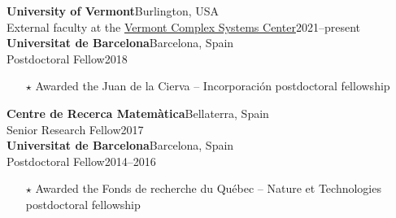 \documentclass[11pt]{article}
\begin{document}
%
\textbf{University of Vermont}\hfill Burlington, USA\\
External faculty at the \href{https://vermontcomplexsystems.org}{Vermont Complex Systems Center}\hfill 2021--present\vspace{0.75\baselineskip}\\
%
\textbf{Universitat de Barcelona}\hfill Barcelona, Spain\\
Postdoctoral Fellow\hfill 2018
\begin{itemize}[noitemsep, leftmargin=1.5em, topsep=0pt, after=\vspace{0.75\baselineskip}]\small
  \item[$\star$] Awarded the Juan de la Cierva -- Incorporaci\'on postdoctoral fellowship
\end{itemize}
%
\textbf{Centre de Recerca Matem\`atica}\hfill Bellaterra, Spain\\
Senior Research Fellow\hfill 2017\vspace{0.75\baselineskip}\\
%
\textbf{Universitat de Barcelona}\hfill Barcelona, Spain\\
Postdoctoral Fellow\hfill 2014--2016
\begin{itemize}[noitemsep, leftmargin=1.5em, topsep=0pt, after=\vspace{0.75\baselineskip}]\small
  \item[$\star$] Awarded the Fonds de recherche du Qu\'ebec -- Nature et Technologies postdoctoral fellowship
\end{itemize}
%
\end{document}

